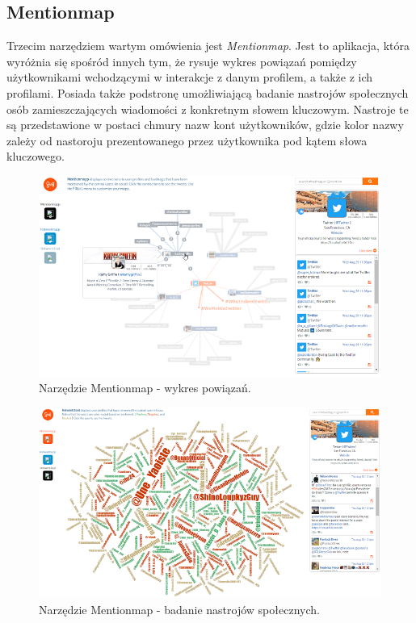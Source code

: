 \subsection{Mentionmap}

Trzecim narzędziem wartym omówienia jest \textit{Mentionmap}. Jest to aplikacja, która wyróżnia się spośród innych tym, że rysuje wykres powiązań pomiędzy użytkownikami wchodzącymi w interakcje z danym profilem, a także z ich profilami. Posiada także podstronę umożliwiającą badanie nastrojów społecznych osób zamieszczających wiadomości z konkretnym słowem kluczowym. Nastroje te są przedstawione w postaci chmury nazw kont użytkowników, gdzie kolor nazwy zależy od nastoroju prezentowanego przez użytkownika pod kątem słowa kluczowego.

\begin{figure}[h] %
	\centering
	\includegraphics[width=0.8\linewidth]{img/twitter_tool_mentionmap}
	\caption{Narzędzie Mentionmap - wykres powiązań.}
\end{figure}

\begin{figure}[h] %
	\centering
	\includegraphics[width=0.8\linewidth]{img/twitter_tool_mentionmap_sentiment}
	\caption{Narzędzie Mentionmap - badanie nastrojów społecznych.}
\end{figure}

